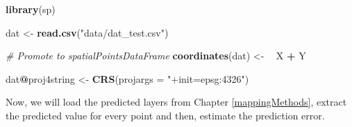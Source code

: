 \documentclass[10pt,b5paper,]{book}
\newenvironment{Shaded}{\begin{snugshade}}{\end{snugshade}}
\newcommand{\CommentTok}[1]{\textcolor[rgb]{0.56,0.35,0.01}{\textit{#1}}}
\newcommand{\DataTypeTok}[1]{\textcolor[rgb]{0.13,0.29,0.53}{#1}}
\newcommand{\ErrorTok}[1]{\textcolor[rgb]{0.64,0.00,0.00}{\textbf{#1}}}
\newcommand{\KeywordTok}[1]{\textcolor[rgb]{0.13,0.29,0.53}{\textbf{#1}}}
\newcommand{\NormalTok}[1]{#1}
\newcommand{\OperatorTok}[1]{\textcolor[rgb]{0.81,0.36,0.00}{\textbf{#1}}}
\newcommand{\StringTok}[1]{\textcolor[rgb]{0.31,0.60,0.02}{#1}}
\theoremstyle{definition}
\theoremstyle{definition}
\theoremstyle{definition}
\theoremstyle{remark}
\begin{document}
\begin{Shaded}
\begin{Highlighting}[]
\KeywordTok{library}\NormalTok{(sp)}

\NormalTok{dat <-}\StringTok{ }\KeywordTok{read.csv}\NormalTok{(}\StringTok{"data/dat_test.csv"}\NormalTok{)}

\CommentTok{# Promote to spatialPointsDataFrame }
\KeywordTok{coordinates}\NormalTok{(dat) <-}\StringTok{ }\ErrorTok{~}\StringTok{ }\NormalTok{X }\OperatorTok{+}\StringTok{ }\NormalTok{Y}

\NormalTok{dat}\OperatorTok{@}\NormalTok{proj4string <-}\StringTok{ }\KeywordTok{CRS}\NormalTok{(}\DataTypeTok{projargs =} \StringTok{"+init=epsg:4326"}\NormalTok{)}
\end{Highlighting}
\end{Shaded}

Now, we will load the predicted layers from Chapter
\ref{mappingMethods}, extract the predicted value for every point and
then, estimate the prediction error.
\end{document}
